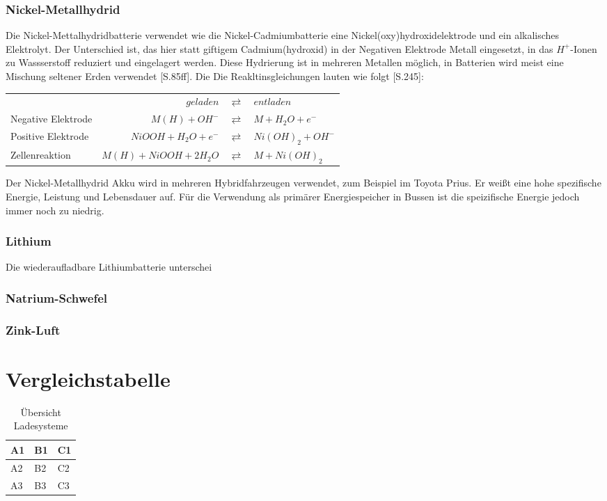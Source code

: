 \subsubsection{Nickel-Metallhydrid}
Die Nickel-Mettalhydridbatterie verwendet wie die Nickel-Cadmiumbatterie eine Nickel(oxy)hydroxidelektrode und ein alkalisches Elektrolyt. Der Unterschied ist, das hier statt giftigem Cadmium(hydroxid) in der Negativen Elektrode Metall eingesetzt, in das $H^+$-Ionen zu Wassserstoff reduziert und eingelagert werden. Diese Hydrierung ist in mehreren Metallen möglich, in Batterien wird meist eine Mischung seltener Erden verwendet \cite{KiehneBattery}[S.85ff]. Die Die Reakltinsgleichungen lauten wie folgt \cite{Sterner:2014}[S.245]:
\begin{table*}[htbp]
  \begin{tabularx}{\linewidth}{XrcX}
  	                   &                       $geladen$ & $\rightleftarrows$ & $entladen$            \\
  	Negative Elektrode & $M(H) + OH^-$ & $\rightleftarrows$ & $M + H_2O + e^-$       \\
  	Positive Elektrode &                  $NiOOH + H_2O + e^-$ & $\rightleftarrows$ & $Ni(OH)_2 + OH^-$ \\ \midrule
  	Zellenreaktion     &         $M(H) + NiOOH + 2H_2O$ & $\rightleftarrows$ & $M + Ni(OH)_2$
  \end{tabularx}
\end{table*}
Der Nickel-Metallhydrid Akku wird in mehreren Hybridfahrzeugen verwendet, zum Beispiel im Toyota Prius. Er weißt eine hohe spezifische Energie, Leistung und Lebensdauer auf. Für die Verwendung als primärer Energiespeicher in Bussen ist die speizifische Energie jedoch immer noch zu niedrig.
\subsubsection{Lithium}
Die wiederaufladbare Lithiumbatterie unterschei
\subsubsection{Natrium-Schwefel} %
\subsubsection{Zink-Luft}
\section{Vergleichstabelle}   %
\begin{table}[htbp]\centering
	\begin{tabularx}{\linewidth}{XXX}
		\toprule
		A1 & B1 & C1 \\ \midrule
		A2 & B2 & C2 \\
		A3 & B3 & C3 \\ \bottomrule
	\end{tabularx}
	\caption{Übersicht Ladesysteme}
	\label{vergleichstabelle_speichertechnologien}
\end{table}